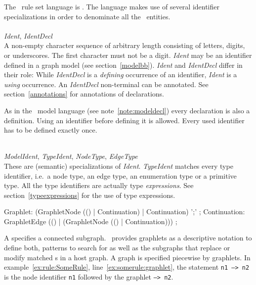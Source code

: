 The \GrG\ rule set language is . The language makes use of several identifier specializations in order to denominate all the \GrG\ entities.\\
\\
\emph{Ident}, \emph{IdentDecl}\\ \nopagebreak
A non-empty character sequence of arbitrary length consisting of letters, digits, or underscores. The first character must not be a digit. \emph{Ident} may be an identifier defined in a graph model (see section~\ref{modelbb}). \emph{Ident} and \emph{IdentDecl} differ in their role: While \emph{IdentDecl} is a \emph{defining} occurrence of an identifier, \emph{Ident} is a \emph{using} occurrence. An \emph{IdentDecl} non-terminal can be annotated. See section~\ref{annotations} for annotations of declarations.
\begin{note}
  As in the \GrG\ model language (see note~\ref{note:modeldecl}) every declaration is also a definition. Using an identifier before defining it is allowed. Every used identifier has to be defined exactly once.
\end{note}
\mbox{ }\\
\emph{ModelIdent}, \emph{TypeIdent}, \emph{NodeType}, \emph{EdgeType}\\
These are (semantic) specializations of \emph{Ident}. \emph{TypeIdent} matches every type identifier, i.e.\ a node type, an edge type, an enumeration type or a primitive type. All the type identifiers are actually type \emph{expressions}. See section~\ref{typeexpressions} for the use of type expressions.\\

\begin{rail}
  Graphlet: (GraphletNode (() | Continuation) | Continuation) ';' ;
  Continuation: GraphletEdge (() | (GraphletNode (() | Continuation))) ;
\end{rail}
A  specifies a connected subgraph. 
\GrG\ provides graphlets as a descriptive notation to define both, patterns to search for as well as the subgraphs that replace or modify matched s in a host graph. 
A graph is specified piecewise by graphlets. 
In example~\ref{ex:rule:SomeRule}, line~\ref{ex:somerule:graphlet}, the statement \texttt{n1 --> n2} is the node identifier \texttt{n1} followed by the  graphlet \texttt{--> n2}.

